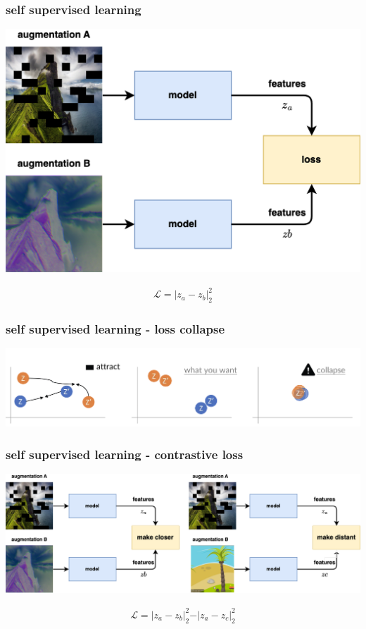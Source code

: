 \documentclass{beamer}
\begin{document}
\begin{frame}
\frametitle{self supervised learning}

  \centering
  \includegraphics[scale=0.8]{../diagrams/self_supervised/self_supervised-basic.png}

  \begin{align*}
    \mathcal{L} = \vert z_a - z_b \vert^2_2
  \end{align*}

\end{frame}


\begin{frame}
\frametitle{self supervised learning - loss collapse}
  
    \centering
    \includegraphics[scale=0.45]{../images/contrastive_loss.png}
  
\end{frame}



\begin{frame}
\frametitle{self supervised learning - contrastive loss}
  
    \centering
    \includegraphics[scale=0.5]{../diagrams/self_supervised/self_supervised-contrastive.png}

    \begin{align*}
      \mathcal{L} = \vert z_a - z_b \vert^2_2 - \vert z_a - z_c \vert^2_2
    \end{align*}

\end{frame}
\end{document}
